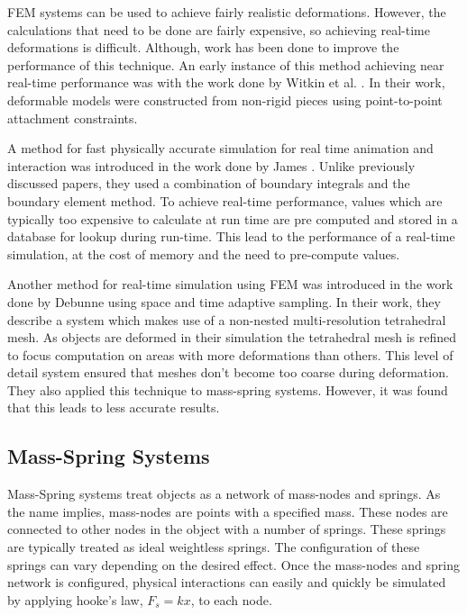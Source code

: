 FEM systems can be used to achieve fairly realistic deformations. However, the calculations that 
need to be done are fairly expensive, so achieving real-time deformations is difficult. Although,
work has been done to improve the performance of this technique.
An early instance of this method achieving near real-time performance was with the work done by 
Witkin et al. \cite{Fast-Animation-and-Control-of-Nonrigid-Structures}. In their work, deformable 
models were constructed from non-rigid pieces using point-to-point attachment constraints. 

A method for fast physically accurate simulation for real time animation and interaction was 
introduced in the work done by James \etal \cite{ArtDefo-Accurate-Real-Time}. 
Unlike previously discussed papers, they used a combination of boundary 
integrals and the boundary element method. To achieve real-time performance, values which are 
typically too expensive to calculate at run time are pre computed and stored in a database for 
lookup during run-time. This lead to the performance of a real-time simulation, at the cost of 
memory and the need to pre-compute values.

Another method for real-time simulation using FEM was introduced in the work done by Debunne \etal 
\cite{Dynamic-Real-Time-Deformations-Using} 
using space and time adaptive sampling. In their work, they describe a system which makes use of a 
non-nested multi-resolution tetrahedral mesh. As objects are deformed in their simulation the 
tetrahedral mesh is refined to focus computation on areas with more deformations than others. This 
level of detail system ensured that meshes don’t become too coarse during deformation. They also 
applied this technique to mass-spring systems. However, it was found that this leads to less 
accurate results.


\subsection{Mass-Spring Systems}


Mass-Spring systems treat objects as a network of mass-nodes and springs. As the name implies, 
mass-nodes are points with a specified mass. These nodes are connected to other nodes in the object
with a number of springs. These springs are typically treated as ideal weightless springs. The 
configuration of these springs can vary depending on the desired effect. 
Once the mass-nodes and 
spring network is configured, physical interactions can easily and quickly be simulated by applying
hooke's law, \(F_s = kx\), to each node. 

